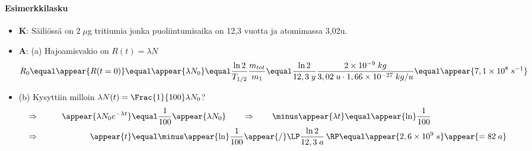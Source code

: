 \begin{frame}
\frametitle{\texorpdfstring{\culine[\sectiontitleulinecolor]{\sectiontitle}}{\sectiontitle} }
\framesubtitle{Esimerkkilasku}
\appear{}

\begin{itemize}
	\item \textbf{K}: Säiliössä on $2 \;\mu$g tritiumia jonka puoliintumisaika on 12,3 vuotta ja atomimassa 3,02u.

\item \textbf{A}: (a) Hajoamisvakio on $R(t)=\lambda N$
\[
R_{0} \equal \appear{R(t=0)} \equal \appear{\lambda N_{0}} \equal \frac{\ln 2}{T_{1 / 2}} \frac{m_{tot}}{m_{1}}  \equal \frac{\ln 2}{12,3 \;y} \frac{2 \times 10^{-9} \;kg}{3,02 \;u \cdot 1,66 \times 10^{-27} \;kg / u}  \equal \appear{7,1 \times 10^{8} \;s^{-1}}
\]
 

\item (b) Kysyttiin milloin $\lambda N(t)=\Frac{1}{100} \lambda N_{0}$? 
$$
\begin{aligned}
 &\Rightarrow \qquad& \appear{\lambda N_{0} e^{-\lambda t}} & \equal \frac{1}{100} \appear{\lambda N_{0}} 
\qquad \Rightarrow \qquad  \minus \appear{\lambda t} \equal \appear{\ln} \frac{1}{100} \\
 &\Rightarrow \qquad&  \appear{t}& \equal  \minus \appear{\ln} \frac{1}{100} \appear{/} \LP \frac{\ln 2}{12,3 \;a} \,\RP \equal \appear{2,6 \times 10^{9} \;s}\appear{=82 \;a}
\end{aligned}
$$

\end{itemize}


\endofslide 
\end{frame}

